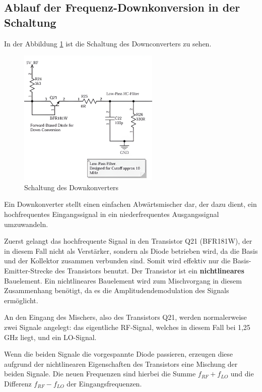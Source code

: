\subsection{Ablauf der Frequenz-Downkonversion in der Schaltung}
In der Abbildung \ref{fig:downconverter} ist die Schaltung des Downconverters zu sehen.
\begin{figure}[H]
    \centering
    \includegraphics[width=0.6\textwidth]{Pictures/Downconverter.png}
    \caption{Schaltung des Downkonverters}
    \label{fig:downconverter}
\end{figure}
Ein Downkonverter stellt einen einfachen Abwärtsmischer dar, der dazu dient, ein hochfrequentes Eingangssignal in ein niederfrequentes Ausgangssignal umzuwandeln. 

Zuerst gelangt das hochfrequente Signal in den Transistor Q21 (BFR181W), der in diesem Fall nicht als Verstärker, sondern als Diode betrieben wird, da die Basis und der Kollektor zusammen verbunden sind. Somit wird effektiv nur die Basis-Emitter-Strecke des Transistors benutzt. Der Transistor ist ein \textbf{nichtlineares} Bauelement.
Ein nichtlineares Bauelement wird zum Mischvorgang in diesem Zusammenhang benötigt, da es die Amplitudendemodulation des Signals ermöglicht. 

An den Eingang des Mischers, also des Transistors Q21, werden normalerweise zwei Signale angelegt: das eigentliche \ac{RF}-Signal, welches in diesem Fall bei 1,25 GHz liegt, und ein \ac{LO}-Signal.

Wenn die beiden Signale die vorgespannte Diode passieren, erzeugen diese aufgrund der nichtlinearen Eigenschaften des Transistors eine Mischung der beiden Signale. Die neuen Frequenzen sind hierbei die Summe $f_{RF} + f_{LO}$ und die Differenz $f_{RF} - f_{LO}$ der Eingangsfrequenzen. 

